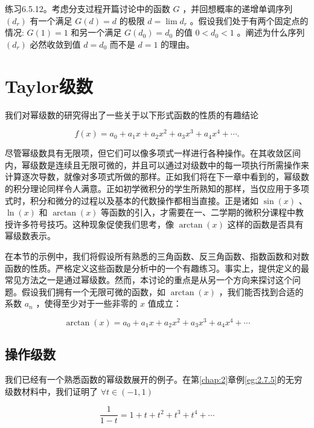 练习6.5.12。考虑分支过程开篇讨论中的函数 \(G\) ，并回想概率的递增单调序列 \(\left( {d}_{r}\right)\) 有一个满足 \(G\left( d\right)  = d\) 的极限 \(d = \lim {d}_{r}\) 。假设我们处于有两个固定点的情况: \(G\left( 1\right)  = 1\) 和另一个满足 \(G\left( {d}_{0}\right)  = {d}_{0}\) 的值 \(0 < {d}_{0} < 1\) 。阐述为什么序列 \(\left( {d}_{r}\right)\) 必然收敛到值 \(d = {d}_{0}\) 而不是 \(d = 1\) 的理由。



\section{Taylor级数}
\label{sec:6.6}
我们对幂级数的研究得出了一些关于以下形式函数的性质的有趣结论

\[
f\left( x\right)  = {a}_{0} + {a}_{1}x + {a}_{2}{x}^{2} + {a}_{3}{x}^{3} + {a}_{4}{x}^{4} + \cdots .
\]

尽管幂级数具有无限项，但它们可以像多项式一样进行各种操作。在其收敛区间内，幂级数是连续且无限可微的，并且可以通过对级数中的每一项执行所需操作来计算逐次导数，就像对多项式所做的那样。正如我们将在下一章中看到的，幂级数的积分理论同样令人满意。正如初学微积分的学生所熟知的那样，当仅应用于多项式时，积分和微分的过程以及基本的代数操作都相当直接。正是诸如 \(\sin \left( x\right)\) 、 \(\ln \left( x\right)\) 和 \(\arctan \left( x\right)\) 等函数的引入，才需要在一、二学期的微积分课程中教授许多符号技巧。这种现象促使我们思考，像 \(\arctan \left( x\right)\) 这样的函数是否具有幂级数表示。

在本节的示例中，我们将假设所有熟悉的三角函数、反三角函数、指数函数和对数函数的性质。严格定义这些函数是分析中的一个有趣练习。事实上，提供定义的最常见方法之一是通过幂级数。然而，本讨论的重点是从另一个方向来探讨这个问题。假设我们拥有一个无限可微的函数，如 \(\arctan \left( x\right)\) ，我们能否找到合适的系数 \({a}_{n}\) ，使得至少对于一些非零的 \(x\) 值成立：

\[
\arctan \left( x\right)  = {a}_{0} + {a}_{1}x + {a}_{2}{x}^{2} + {a}_{3}{x}^{3} + {a}_{4}{x}^{4} + \cdots
\]

\subsection{操作级数}

我们已经有一个熟悉函数的幂级数展开的例子。在第\ref{chap:2}章例\ref{eg:2.7.5}的无穷级数材料中，我们证明了 \(\forall t \in  \left( {-1,1}\right)\)

\begin{equation}
\label{eq:6.6.1}
\frac{1}{1 - t} = 1 + t + {t}^{2} + {t}^{3} + {t}^{4} + \cdots
\end{equation}

